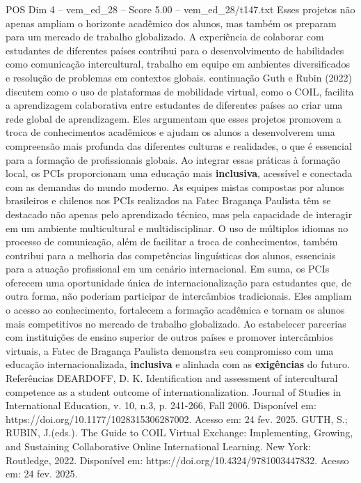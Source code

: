 \begin{textsample}{POS Dim 4 – vem\_ed\_28 – Score 5.00 – vem\_ed\_28/t147.txt}
Esses projetos não apenas ampliam o horizonte acadêmico dos alunos, mas também os preparam para um mercado de trabalho globalizado.
A experiência de colaborar com estudantes de diferentes países contribui para o desenvolvimento de habilidades como comunicação intercultural, trabalho em equipe em ambientes diversificados e resolução de problemas em contextos globais. continuação Guth e Rubin (2022) discutem como o uso de plataformas de mobilidade virtual, como o COIL, facilita a aprendizagem colaborativa entre estudantes de diferentes países ao criar uma rede global de aprendizagem.
Eles argumentam que esses projetos promovem a troca de conhecimentos acadêmicos e ajudam os alunos a desenvolverem uma compreensão mais profunda das diferentes culturas e realidades, o que é essencial para a formação de profissionais globais.
Ao integrar essas práticas à formação local, os PCIs proporcionam uma educação mais \textbf{inclusiva}, acessível e conectada com as demandas do mundo moderno.
As equipes mistas compostas por alunos brasileiros e chilenos nos PCIs realizados na Fatec Bragança Paulista têm se destacado não apenas pelo aprendizado técnico, mas pela capacidade de interagir em um ambiente multicultural e multidisciplinar.
O uso de múltiplos idiomas no processo de comunicação, além de facilitar a troca de conhecimentos, também contribui para a melhoria das competências linguísticas dos alunos, essenciais para a atuação profissional em um cenário internacional.
Em suma, os PCIs oferecem uma oportunidade única de internacionalização para estudantes que, de outra forma, não poderiam participar de intercâmbios tradicionais.
Eles ampliam o acesso ao conhecimento, fortalecem a formação acadêmica e tornam os alunos mais competitivos no mercado de trabalho globalizado.
Ao estabelecer parcerias com instituições de ensino superior de outros países e promover intercâmbios virtuais, a Fatec de Bragança Paulista demonstra seu compromisso com uma educação internacionalizada, \textbf{inclusiva} e alinhada com as \textbf{exigências} do futuro.
Referências DEARDOFF, D.
K.
Identification and assessment of intercultural competence as a student outcome of internationalization.
Journal of Studies in International Education, v. 10, n.3, p. 241-266, Fall 2006.
Disponível em: https://doi.org/10.1177/1028315306287002.
Acesso em: 24 fev. 2025.
GUTH, S.; RUBIN, J.(eds.).
The Guide to COIL Virtual Exchange: Implementing, Growing, and Sustaining Collaborative Online International Learning.
New York: Routledge, 2022.
Disponível em: https://doi.org/10.4324/9781003447832.
Acesso em: 24 fev. 2025.

\end{textsample}
